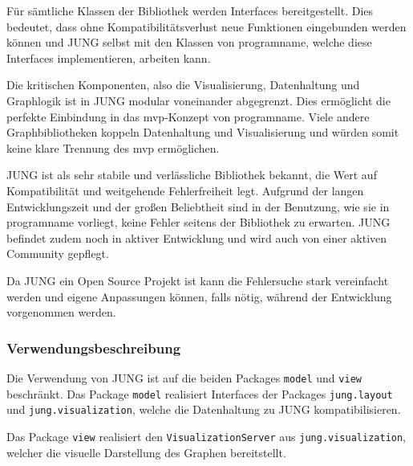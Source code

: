 Für sämtliche Klassen der Bibliothek werden Interfaces bereitgestellt. Dies bedeutet, dass ohne Kompatibilitätsverlust neue Funktionen eingebunden werden können und JUNG selbst mit den Klassen von \gls{programname}, welche diese Interfaces implementieren, arbeiten kann.

Die kritischen Komponenten, also die Visualisierung, Datenhaltung und Graphlogik ist in JUNG modular voneinander abgegrenzt. Dies ermöglicht die perfekte Einbindung in das \gls{mvp}-Konzept von \gls{programname}. Viele andere Graphbibliotheken koppeln Datenhaltung und Visualisierung und würden somit keine klare Trennung des \gls{mvp} ermöglichen.

JUNG ist als sehr stabile und verlässliche Bibliothek bekannt, die Wert auf Kompatibilität und weitgehende Fehlerfreiheit legt. Aufgrund der langen Entwicklungszeit und der großen Beliebtheit sind in der Benutzung, wie sie in \gls{programname} vorliegt, keine Fehler seitens der Bibliothek zu erwarten. JUNG befindet zudem noch in aktiver Entwicklung und wird auch von einer aktiven Community gepflegt.

Da JUNG ein Open Source Projekt ist kann die Fehlersuche stark vereinfacht werden und eigene Anpassungen können, falls nötig, während der Entwicklung vorgenommen werden.

\subsubsection{Verwendungsbeschreibung}

Die Verwendung von JUNG ist auf die beiden Packages \texttt{model} und  \texttt{view} beschränkt. Das Package \texttt{model} realisiert Interfaces der Packages \texttt{jung.layout} und \texttt{jung.visualization}, welche die Datenhaltung zu JUNG kompatibilisieren.

Das Package \texttt{view} realisiert den \texttt{VisualizationServer} aus \texttt{jung.visualization}, welcher die visuelle Darstellung des Graphen bereitstellt.
